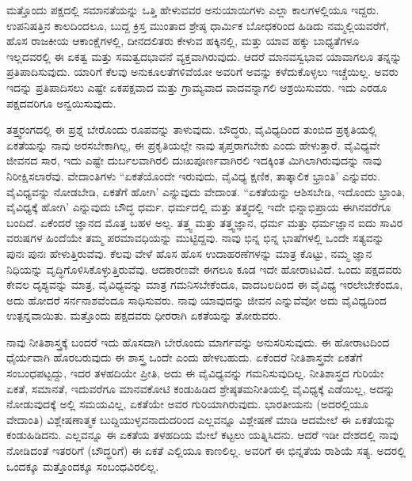 ಮತ್ತೊಂದು ಪಕ್ಷದಲ್ಲಿ ಸಮಾನತೆಯನ್ನು ಒತ್ತಿ ಹೇಳುವವರ ಅನುಯಾಯಿಗಳು ಎಲ್ಲಾ ಕಾಲಗಳಲ್ಲಿಯೂ ಇದ್ದರು. ಉಪನಿಷತ್ತಿನ ಕಾಲದಿಂದಲೂ, ಬುದ್ದ ಕ್ರಿಸ್ತ ಮುಂತಾದ ಶ್ರೇಷ್ಠ ಧಾರ್ಮಿಕ ಬೋಧಕರಿಂದ ಹಿಡಿದು ನಮ್ಮಲ್ಲಿಯವರೆಗೆ, ಹೊಸ ರಾಜಕೀಯ ಆಕಾಂಕ್ಷೆಗಳಲ್ಲಿ, ದೀನದಲಿತರು ಕೇಳುವ ಹಕ್ಕಿನಲ್ಲಿ, ಮತ್ತು ಯಾವ ಹಕ್ಕು ಬಾಧ್ಯತೆಗಳೂ ಇಲ್ಲದವರಲ್ಲಿ ಈ ಏಕತ್ವ ಮತ್ತು ಸಮತ್ವದಭಾವನೆ ವ್ಯಕ್ತವಾಗಿರುವುದು. ಆದರೆ ಮಾನವಸ್ವಭಾವ ಯಾವಾಗಲೂ ತನ್ನನ್ನು ಪ್ರತಿಪಾದಿಸುವುದು. ಯಾರಿಗೆ ಕೆಲವು ಅನುಕೂಲತೆಗಳಿವೆಯೋ ಅವರಿಗೆ ಅವನ್ನು ಕಳೆದುಕೊಳ್ಳಲು ಇಚ್ಚೆಯಿಲ್ಲ. ಅವರು ಇದನ್ನು ಪ್ರತಿಪಾದಿಸಲು ಎಷ್ಟೇ ಏಕಪಕ್ಷವಾದ ಮತ್ತು ಗ್ರಾಮ್ಯವಾದ ವಾದವನ್ನಾಗಲಿ ಆಶ್ರಯಿಸುವರು. ಇದು ಎರಡೂ ಪಕ್ಷದವರಿಗೂ ಅನ್ವಯಿಸುವುದು.

ತತ್ತ್ವರಂಗದಲ್ಲಿ ಈ ಪ್ರಶ್ನೆ ಬೇರೊಂದು ರೂಪವನ್ನು ತಾಳುವುದು. ಬೌದ್ಧರು, ವೈವಿಧ್ಯದಿಂದ ತುಂಬಿದ ಪ್ರಕೃತಿಯಲ್ಲಿ ಏಕತೆಯನ್ನು ನಾವು ಅರಸಬೇಕಾಗಿಲ್ಲ, ಈ ಪ್ರಕೃತಿಯಲ್ಲೇ ನಾವು ತೃಪ್ತರಾಗಬೇಕು ಎಂದು ಹೇಳುತ್ತಾರೆ. ವೈವಿಧ್ಯವೇ ಜೀವನದ ಸಾರ, ಇದು ಎಷ್ಟೇ ದುರ್ಬಲವಾಗಿರಲಿ ದುಃಖಪೂರ್ಣವಾಗಿರಲಿ ಇದಕ್ಕಿಂತ ಮಿಗಿಲಾಗಿರುವುದನ್ನು ನಾವು ನಿರೀಕ್ಷಿಸಲಾರೆವು. ವೇದಾಂತಿಗಳು “ಏಕತೆಯೊಂದೇ ಇರುವುದು, ವೈವಿಧ್ಯ ಕ್ಷಣಿಕ, ತಾತ್ಕಾಲಿಕ ಭ್ರಾಂತಿ' ಎನ್ನುವರು. ವೈವಿಧ್ಯವನ್ನು ನೋಡಬೇಡಿ, ಏಕತೆಗೆ ಹೋಗಿ' ಎನ್ನುವುದು ವೇದಾಂತ. “ಏಕತೆಯನ್ನು ಆಶಿಸಬೇಡಿ, ಇದೊಂದು ಭ್ರಾಂತಿ, ವೈವಿಧ್ಯಕ್ಕೆ ಹೋಗಿ' ಎನ್ನುವುದು ಬೌದ್ಧ ಧರ್ಮ. ಧರ್ಮದಲ್ಲಿ ಮತ್ತು ತತ್ತ್ವದಲ್ಲಿ ಇದೇ ಭಿನ್ನಾಭಿಪ್ರಾಯ ಈಗಿನವರೆಗೂ ಬಂದಿದೆ. ಏಕೆಂದರೆ ಜ್ಞಾನದ ಮೊತ್ತ ಬಹಳ ಅಲ್ಪ. ತತ್ತ್ವ ಮತ್ತು ತತ್ತ್ವಜ್ಞಾನ, ಧರ್ಮ ಮತ್ತು ಧರ್ಮಜ್ಞಾನ ಐದು ಸಾವಿರ ವರುಷಗಳ ಹಿಂದೆಯೇ ತಮ್ಮ ಪರಮಾವಧಿಯನ್ನು ಮುಟ್ಟಿದ್ದವು. ನಾವು ಭಿನ್ನ ಭಿನ್ನ ಭಾಷೆಗಳಲ್ಲಿ ಒಂದೇ ಸತ್ಯವನ್ನು ಪುನಃ ಪುನಃ ಹೇಳುತ್ತಿರುವೆವು. ಕೆಲವು ವೇಳೆ ಹೊಸ ಹೊಸ ಉದಾಹರಣೆಗಳನ್ನು ಮಾತ್ರ ಕೊಟ್ಟು, ನಮ್ಮ ಜ್ಞಾನ ನಿಧಿಯನ್ನು ವೃದ್ಧಿಗೊಳಿಸಿಕೊಳ್ಳುತ್ತಿರುವೆವು. ಆದಕಾರಣವೇ ಈಗಲೂ ಕೂಡ ಇದೇ ಹೋರಾಟವಿದೆ. ಒಂದು ಪಕ್ಷದವರು ಕೇವಲ ದೃಶ್ಯವನ್ನು ಮಾತ್ರ, ವೈವಿಧ್ಯವನ್ನು ಮಾತ್ರ ಗಮನಿಸಬೇಕೆಂದೂ, ವಾದಬಲದಿಂದ ಈ ವೈವಿಧ್ಯ ಇರಲೇಬೇಕೆಂದೂ, ಅದು ಹೋದರೆ ಸರ್ನನಾಶವೆಂದೂ ಸಾಧಿಸುವರು. ನಾವು ಯಾವುದನ್ನು ಜೀವನ ಎನ್ನುವೆವೋ ಅದು ವೈವಿಧ್ಯದಿಂದ ಉತ್ಪನ್ನವಾಯಿತು. ಮತ್ತೊಂದು ಪಕ್ಷದವರು ಧೀರರಾಗಿ ಏಕತೆಯನ್ನು ತೋರುವರು.

ನಾವು ನೀತಿಶಾಸ್ತ್ರಕ್ಕೆ ಬಂದರೆ ಇದು ಹೊಸದಾಗಿ ಬೇರೊಂದು ಮಾರ್ಗವನ್ನು ಅನುಸರಿಸುವುದು. ಈ ಹೋರಾಟದಿಂದ ಧೈರ್ಯವಾಗಿ ಹೊರಬರುವುದು ಈ ಶಾಸ್ತ್ರ ಒಂದೇ ಎಂದು ಹೇಳಬಹುದು. ಏಕೆಂದರೆ ನೀತಿಶಾಸ್ತ್ರವೇ ಏಕತೆಗೆ ಸಂಬಂಧಪಟ್ಟದ್ದು, ಇದರ ತಳಹದಿಯೇ ಪ್ರೀತಿ, ಅದು ಈ ವೈವಿಧ್ಯವನ್ನು ಗಮನಿಸುವುದಿಲ್ಲ. ನೀತಿಶಾಸ್ತ್ರದ ಗುರಿಯೇ ಏಕತೆ, ಸಮಾನತೆ, ಇದುವರೆಗೂ ಮಾನವಕೋಟಿ ಕಂಡುಹಿಡಿದ ಶ್ರೇಷ್ಠತಮನೀತಿಯಲ್ಲಿ ವೈವಿಧ್ಯಕ್ಕೆ ಎಡೆಯಿಲ್ಲ, ಅದನ್ನು ನೋಡುವುದಕ್ಕೆ ಅಲ್ಲಿ ಸಮಯವಿಲ್ಲ, ಏಕತೆಯೇ ಅವರ ಗುರಿಯಾಗಿರುವುದು. ಭಾರತೀಯನು (ಅದರಲ್ಲಿಯೂ ವೇದಾಂತಿ) ವಿಶ್ಲೇಷಣಾತ್ಮಕ ಬುದ್ದಿಯುಳ್ಳವನಾದುದರಿಂದ ಎಲ್ಲವನ್ನೂ ವಿಶ್ಲೇಷಣೆ ಮಾಡಿ ಆದಮೇಲೆ ಈ ಏಕತೆಯನ್ನು ಕಂಡುಹಿಡಿದನು. ಎಲ್ಲವನ್ನೂ ಈ ಏಕತೆಯ ತಳಹದಿಯ ಮೇಲೆ ಕಟ್ಟಲು ಯತ್ನಿಸಿದನು. ಆದರೆ ಇಡೀ ದೇಶದಲ್ಲಿ ನಾವು ನೋಡಿದಂತೆ ಇತರರಿಗೆ (ಬೌದ್ಧರಿಗೆ) ಈ ಏಕತೆ ಎಲ್ಲಿಯೂ ಕಾಣಲಿಲ್ಲ. ಅವರಿಗೆ ಈ ಭಿನ್ನತೆಯ ರಾಶಿಯೆ ಸತ್ಯ. ಅದರಲ್ಲಿ ಒಂದಕ್ಕೂ ಮತ್ತೊಂದಕ್ಕೂ ಸಂಬಂಧವಿರಲಿಲ್ಲ.

